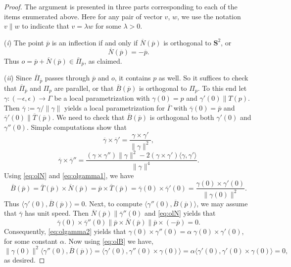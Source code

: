 \documentclass[11pt]{amsart}
\theoremstyle{definition}
\newcommand{\ol}{\overline}
\renewcommand{\S}{\mathbf{S}}
\renewcommand{\l}{\langle}
\renewcommand{\r}{\rangle}
\renewcommand{\(}{\left(}
\renewcommand{\)}{\right)}
\begin{document}
\begin{proof}
The argument is presented in three parts corresponding to each of the items enumerated above. Here for any pair of vector $v$, $w$, we use the notation $v\parallel w$ to indicate that $v=\lambda w$ for some $\lambda>0$.

(\emph{i}) 
The point $\ol p$ is an inflection if and only if $\ol N(\ol p)$ is orthogonal to $\S^2$, or
\begin{equation}\label{eq:olN}
\ol N(\ol p)=-\ol p.
\end{equation}
 Thus $o=\ol p+\ol N(\ol p)\in\ol \Pi_{\ol p}$, as claimed. 

(\emph{ii}) 
Since $\ol\Pi_{\ol p}$ passes through $\ol p$ and $o$, it contains $p$ as well. So it suffices to check that $\ol\Pi_{\ol p}$ and $\Pi_p$ are parallel, or that $\ol B(\ol p)$ is orthogonal to $\Pi_p$. To this end let $\gamma\colon (-\epsilon, \epsilon)\to\Gamma$ be a  local parametrization with $\gamma(0)=p$ and $\gamma'(0)\parallel T(p)$. Then $\ol\gamma:=\gamma/\|\gamma\|$ yields a local parametrization for $\ol\Gamma$ with $\ol\gamma(0)=\ol p$ and $\ol\gamma'(0)\parallel \ol T(\ol p)$.  We need to check that $\ol B(\ol p)$ is orthogonal to both $\gamma'(0)$ and $\gamma''(0)$. Simple computations show that
\begin{equation}\label{eq:olgamma1}
\ol\gamma\times \ol\gamma'=\frac{\gamma\times \gamma'}{\|\gamma\|^2},
\end{equation}
\begin{equation}\label{eq:olgamma2}
\ol\gamma\times\ol\gamma''=\frac{(\gamma\times\gamma'')\|\gamma\|^2-2(\gamma\times\gamma')\l\gamma,\gamma'\r}{\|\gamma\|^4}.
\end{equation}
Using \eqref{eq:olN} and \eqref{eq:olgamma1}, we have
\begin{equation}\label{eq:olB}
\ol B(\ol p)=\ol T(\ol p)\times \ol N(\ol p)=\ol p\times \ol T(\ol p)=\ol\gamma(0)\times \ol\gamma'(0)
=\frac{\gamma(0)\times \gamma'(0)}{\|\gamma(0)\|^2}.
\end{equation}
Thus
$
\langle \gamma'(0), \ol B(\ol p)\rangle=0.
$
Next, to compute $\l\gamma''(0), \ol B(\ol p)\r$, we may assume that $\ol\gamma$ has unit speed. Then $\ol N(\ol p)\parallel \ol\gamma''(0)$ and \eqref{eq:olN} yields that 
$$
\ol\gamma(0)\times \ol\gamma''(0)\parallel  \ol p\times \ol N(\ol p)\parallel \ol p\times(-\ol p)=0.
$$
Consequently, \eqref{eq:olgamma2} yields that $\gamma(0)\times\gamma''(0)=\alpha\; \gamma(0)\times\gamma'(0)$, for some constant $\alpha$. Now
using \eqref{eq:olB} we have, 
$$
\|\gamma(0)\|^2\l\gamma''(0), \ol B(\ol p)\r=\l\gamma'(0),\gamma''(0)\times\gamma(0)\r=
\alpha\l\gamma'(0),\gamma'(0)\times\gamma(0)\r=0,
$$
as desired. 


\end{proof}
\end{document}
